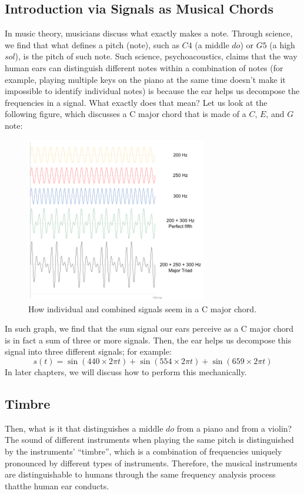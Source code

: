\subsection{Introduction via Signals as Musical Chords}
In music theory, musicians discuss what exactly makes a note.
Through science, we find that what defines a pitch (note), such as $C4$ (a middle $do$) or $G5$ (a high $sol$), is the pitch of such note.
Such science, psychoacoustics, claims that the way human ears can distinguish different notes within a combination of notes (for example, playing multiple keys on the piano at the same time doesn't make it impossible to identify individual notes) is because the ear helps us decompose the frequencies in a signal.
What exactly does that mean?
Let us look at the following figure, which discusses a C major chord that is made of a $C$, $E$, and $G$ note:
\begin{center}
    \begin{figure}[h]
        \centering
        \includegraphics[width=0.7\textwidth]{figs/ln11/330px-Major_triad.svg.png}
        \caption{How individual and combined signals seem in a C major chord.}
    \end{figure}
\end{center}
In such graph, we find that the sum signal our ears perceive as a C major chord is in fact a sum of three or more signals.
Then, the ear helps us decompose this signal into three different signals; for example:
\[
    s(t) = \sin(440 \times 2\pi t) + \sin(554 \times 2\pi t) + \sin(659 \times 2\pi t)
\]
In later chapters, we will discuss how to perform this mechanically.

\subsection{Timbre}
Then, what is it that distinguishes a middle $do$ from a piano and from a violin?
The sound of different instruments when playing the same pitch is distinguished by the instruments' ``timbre'', which is a combination of frequencies uniquely pronounced by different types of instruments.
Therefore, the musical instruments are distinguishable to humans through the same frequency analysis process thatthe human ear conducts.

